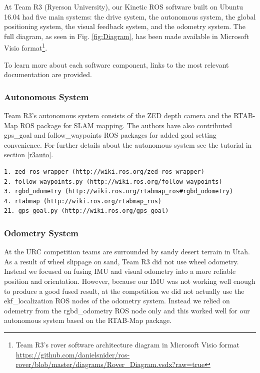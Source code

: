 \documentclass[runningheads,a4paper]{llncs}
\begin{document}
At Team R3 (Ryerson University), our Kinetic ROS software built on Ubuntu 16.04 had five main systems: the drive system, the autonomous system, the global positioning system, the visual feedback system, and the odometry system. The full diagram, as seen in Fig. \ref{fig:Diagram}, has been made available in Microsoft Visio format\footnote{Team R3's rover software architecture diagram in Microsoft Visio format \url{https://github.com/danielsnider/ros-rover/blob/master/diagrams/Rover_Diagram.vsdx?raw=true}}.

To learn more about each software component, links to the most relevant documentation are provided.

\subsubsection*{Autonomous System}
Team R3's autonomous system consists of the ZED depth camera and the RTAB-Map ROS package for SLAM mapping\cite{labbe2014online}. The authors have also contributed gps\_goal and follow\_waypoints ROS packages for added goal setting convenience. For further details about the autonomous system see the tutorial in section \ref{r3auto}.

\begin{lstlisting}[frame=single,caption={Autonomous system software used in Team R3's rover (numbers refer to Fig. \ref{fig:Diagram}).},basicstyle=\sffamily\scriptsize]
1. zed-ros-wrapper (http://wiki.ros.org/zed-ros-wrapper)
2. follow_waypoints.py (http://wiki.ros.org/follow_waypoints)
3. rgbd_odometry (http://wiki.ros.org/rtabmap_ros#rgbd_odometry)
4. rtabmap (http://wiki.ros.org/rtabmap_ros)
21. gps_goal.py (http://wiki.ros.org/gps_goal)
\end{lstlisting}

\subsubsection*{Odometry System}\label{odomsys}
At the URC competition teams are surrounded by sandy desert terrain in Utah. As a result of wheel slippage on sand, Team R3 did not use wheel odometry. Instead we focused on fusing IMU and visual odometry into a more reliable position and orientation. However, because our IMU was not working well enough to produce a good fused result, at the competition we did not actually use the ekf\_localization\cite{MooreStouchKeneralizedEkf2014} ROS nodes of the odometry system. Instead we relied on odemetry from the rgbd\_odometry ROS node only and this worked well for our autonomous system based on the RTAB-Map package.
\end{document}
